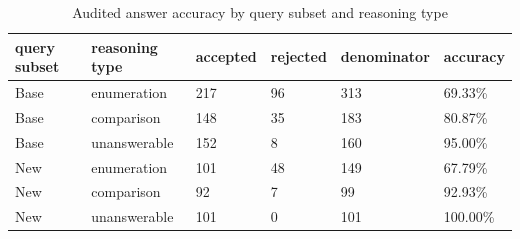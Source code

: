 \begin{table}[htbp]
\centering
\setlength{\tabcolsep}{5pt}
\caption{Audited answer accuracy by query subset and reasoning type}
\label{tab:d5c-query-subset-by-reasoning}
\begin{tabular}{llllll}
\toprule
query subset & reasoning type & accepted & rejected & denominator & accuracy \\
\midrule
Base & enumeration & 217 & 96 & 313 & 69.33\% \\
Base & comparison & 148 & 35 & 183 & 80.87\% \\
Base & unanswerable & 152 & 8 & 160 & 95.00\% \\
New & enumeration & 101 & 48 & 149 & 67.79\% \\
New & comparison & 92 & 7 & 99 & 92.93\% \\
New & unanswerable & 101 & 0 & 101 & 100.00\% \\
\bottomrule
\end{tabular}
\end{table}
